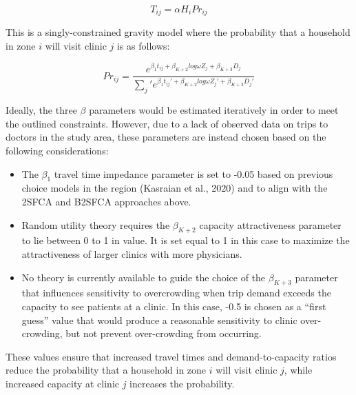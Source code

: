 \documentclass[]{elsarticle} %
\providecommand{\tightlist}{%
  \setlength{\itemsep}{0pt}\setlength{\parskip}{0pt}}
\begin{document}
\[
T_{ij} = \alpha H_i Pr_{ij}
\]

This is a singly-constrained gravity model where the probability that a
household in zone \(i\) will visit clinic \(j\) is as follows:

\[
Pr_{ij} = \frac{e^{\beta_1 t_{ij} + \beta_{K+2} log \omega Z_j + \beta_{K + 3} D_j}}{\sum_j\prime e^{\beta_1 t_{ij}\prime + \beta_{K+2} log \omega Z_j\prime + \beta_{K + 3} D_j\prime}}
\]

Ideally, the three \(\beta\) parameters would be estimated iteratively
in order to meet the outlined constraints. However, due to a lack of
observed data on trips to doctors in the study area, these parameters
are instead chosen based on the following considerations:

\begin{itemize}
\tightlist
\item
  The \(\beta_1\) travel time impedance parameter is set to -0.05 based
  on previous choice models in the region (Kasraian et al., 2020) and to
  align with the 2SFCA and B2SFCA approaches above.
\item
  Random utility theory requires the \(\beta_{K+2}\) capacity
  attractiveness parameter to lie between 0 to 1 in value. It is set
  equal to 1 in this case to maximize the attractiveness of larger
  clinics with more physicians.
\item
  No theory is currently available to guide the choice of the
  \(\beta_{K+3}\) parameter that influences sensitivity to overcrowding
  when trip demand exceeds the capacity to see patients at a clinic. In
  this case, -0.5 is chosen as a ``first guess'' value that would
  produce a reasonable sensitivity to clinic over-crowding, but not
  prevent over-crowding from occurring.
\end{itemize}

These values ensure that increased travel times and demand-to-capacity
ratios reduce the probability that a household in zone \(i\) will visit
clinic \(j\), while increased capacity at clinic \(j\) increases the
probability.
\end{document}

